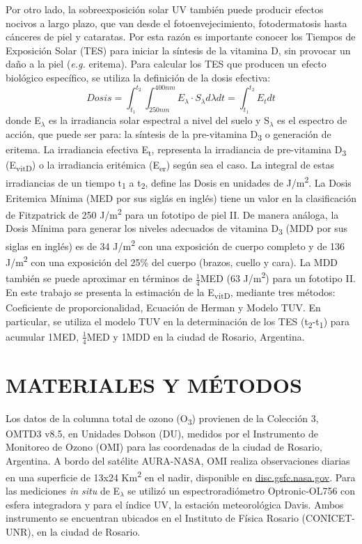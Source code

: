 \documentclass[10pt,twocolumn]{article}
\begin{document}
Por otro lado, la sobreexposición solar UV también puede producir efectos nocivos a largo plazo, que van desde el fotoenvejecimiento, fotodermatosis hasta cánceres de piel y cataratas.\cite{Gilaberte2011,Modenese2016} Por esta razón es importante conocer los Tiempos de Exposición Solar (TES) para iniciar la síntesis de la vitamina D, sin provocar un daño a la piel (\emph{e.g.} eritema). Para calcular los TES que producen un efecto biológico específico, se utiliza la definición de la dosis efectiva:
\begin{equation}
  Dosis=\int_{t_1}^{t_2} \int_{250nm}^{400nm} E_\lambda\cdot S_\lambda d\lambda dt = \int_{t_1}^{t_2}E_tdt \label{eq:dosis}
\end{equation}
donde E$_\lambda$ es la irradiancia solar espectral a nivel del suelo y S$_\lambda$ es el espectro de acción, que puede ser para: la síntesis de la pre-vitamina D\textsubscript{3} o generación de eritema. La irradiancia efectiva E\textsubscript{t}, representa la irradiancia de pre-vitamina D\textsubscript{3} (E\textsubscript{vitD}) o la irradiancia eritémica (E\textsubscript{er}) según sea el caso. La integral de estas irradiancias de un tiempo t\textsubscript{1} a t\textsubscript{2}, define las Dosis en unidades de J/m\textsuperscript{2}.
La Dosis Eritemica Mínima (MED por sus siglás en inglés) tiene un valor en la clasificación de Fitzpatrick de 250 J/m\textsuperscript{2} para un fototipo de piel II.\cite{Fitzpatrick1988} De manera análoga, la Dosis Mínima para generar los niveles adecuados de vitamina D\textsubscript{3} (MDD por sus siglas en inglés) es de 34 J/m\textsuperscript{2} con una exposición de cuerpo completo y de 136 J/m\textsuperscript{2} con una exposición del 25\% del cuerpo (brazos, cuello y cara).\cite{UVDoses, Fioletov_2010} La MDD también se puede aproximar en términos de $\frac{1}{4}$MED (63 J/m\textsuperscript{2}) para un fototipo II\cite{Dowdy_2010}. En este trabajo se presenta la estimación de la E\textsubscript{vitD}, mediante tres métodos: Coeficiente de proporcionalidad,\cite{UVDoses} Ecuación de Herman\cite{Herman2010} y Modelo TUV.\cite{Madronich1987} En particular, se utiliza el modelo TUV en la determinación de los TES (t\textsubscript{2}-t\textsubscript{1}) para acumular 1MED, $\frac{1}{4}$MED y 1MDD en la ciudad de Rosario, Argentina.

\section{MATERIALES Y MÉTODOS}
Los datos de la columna total de ozono (O\textsubscript{3}) provienen de la Colección 3, OMTD3 v8.5, en Unidades Dobson (DU), medidos por el Instrumento de Monitoreo de Ozono (OMI) para las coordenadas de la ciudad de Rosario, Argentina. A bordo del satélite AURA-NASA, OMI realiza observaciones diarias en una superficie de 13x24 Km\textsuperscript{2} en el nadir, disponible en \href{(disc.gsfc.nasa.gov)}{\url{disc.gsfc.nasa.gov}}. Para las mediciones \emph{in situ} de E$_\lambda$ se utilizó un espectroradiómetro Optronic-OL756 con esfera integradora y para el índice UV, la estación meteorológica Davis. Ambos instrumento se encuentran ubicados en el Instituto de Física Rosario (CONICET-UNR), en la ciudad de Rosario.
\end{document}

